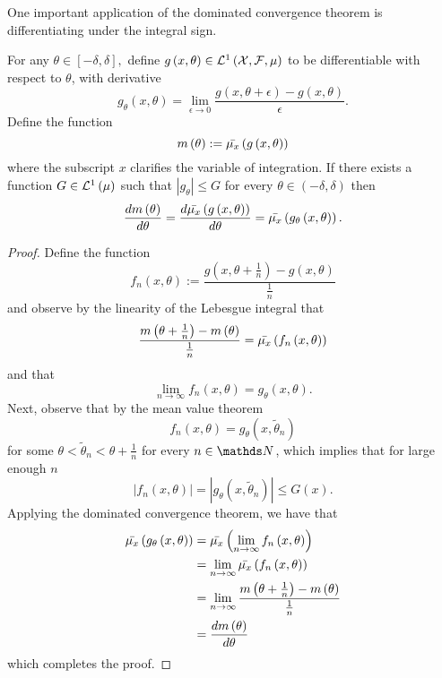 One important application of the dominated convergence theorem is
differentiating under the integral sign.
\begin{thm}
\label{thm:diffIntSign}For any $\theta\in\left[-\delta,\delta\right],$
define $g\left(x,\theta\right)\in\mathcal{L}^{1}\left(\mathcal{X},\mathcal{F},\mu\right)$ to be differentiable
with respect to $\theta$, with derivative
\[
g_{\theta}\left(x,\theta\right)=\lim_{\epsilon\to0}\frac{g\left(x,\theta+\epsilon\right)-g\left(x,\theta\right)}{\epsilon}.
\]
Define the function
\[
m\left(\theta\right):=\bar{{\mu}_{x}}\left(g\left(x,\theta\right)\right)
\]
where the subscript $x$ clarifies the variable of integration. If
there exists a function $G\in\mathcal{L}^{1}\left(\mu\right)$ such that $\left|g_{\theta}\right|\leq G$
for every $\theta\in\left(-\delta,\delta\right)$ then
\[
\frac{dm\left(\theta\right)}{d\theta}=\frac{d\bar{{\mu}_{x}}\left(g\left(x,\theta\right)\right)}{d\theta}=\bar{{\mu}_{x}}\left(g_{\theta}\left(x,\theta\right)\right).
\]
\end{thm}

\begin{proof}
Define the function 
\[
f_{n}\left(x,\theta\right):=\frac{g\left(x,\theta+\frac{1}{n}\right)-g\left(x,\theta\right)}{\frac{1}{n}}
\]
and observe by the linearity of the Lebesgue integral that 
\[
\frac{m\left(\theta+\frac{1}{n}\right)-m\left(\theta\right)}{\frac{1}{n}}=\bar{\mu_{x}}\left(f_{n}\left(x,\theta\right)\right)
\]
and that 
\[
\lim_{n\to\infty}f_{n}\left(x,\theta\right)=g_{\theta}\left(x,\theta\right).
\]
Next, observe that by the mean value theorem
\[
f_{n}\left(x,\theta\right)=g_{\theta}\left(x,\tilde{\theta}_{n}\right)
\]
for some $\theta<\tilde{\theta}_{n}<\theta+\frac{1}{n}$ for every
$n\in\N$, which implies that for large enough $n$
\[
\left|f_{n}\left(x,\theta\right)\right|=\left|g_{\theta}\left(x,\tilde{\theta}_{n}\right)\right|\leq G\left(x\right).
\]
Applying the dominated convergence theorem, we have that
\begin{align*}
\bar{{\mu}_{x}}\left(g_{\theta}\left(x,\theta\right)\right) & =\bar{{\mu}_{x}}\left(\lim_{n\to\infty}f_{n}\left(x,\theta\right)\right)\\
 & =\lim_{n\to\infty}\bar{{\mu}_{x}}\left(f_{n}\left(x,\theta\right)\right)\\
 & =\lim_{n\to\infty}\frac{m\left(\theta+\frac{1}{n}\right)-m\left(\theta\right)}{\frac{1}{n}}\\
 & =\frac{dm\left(\theta\right)}{d\theta}
\end{align*}
which completes the proof.
\end{proof}

